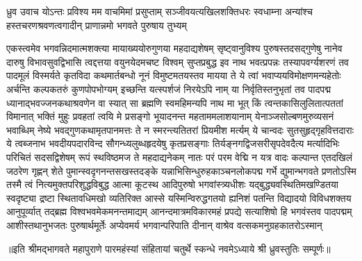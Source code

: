 
ध्रुव उवाच\nopagebreak[4]
\fourlineindentedshloka
{योऽन्तः प्रविश्य मम वाचमिमां प्रसुप्ताम्}
{सञ्जीवयत्यखिलशक्तिधरः स्वधाम्ना}
{अन्यांश्च हस्तचरणश्रवणत्वगादीन्}
{प्राणान्नमो भगवते पुरुषाय तुभ्यम्}

\fourlineindentedshloka
{एकस्त्वमेव भगवन्निदमात्मशक्त्या}
{मायाख्ययोरुगुणया महदाद्यशेषम्}
{सृष्ट्वानुविश्य पुरुषस्तदसद्गुणेषु}
{नानेव दारुषु विभावसुवद्विभासि}
\fourlineindentedshloka
{त्वद्दत्तया वयुनयेदमचष्ट विश्वम्}
{सुप्तप्रबुद्ध इव नाथ भवत्प्रपन्नः}
{तस्यापवर्ग्यशरणं तव पादमूलं}
{विस्मर्यते कृतविदा कथमार्तबन्धो}
\fourlineindentedshloka
{नूनं विमुष्टमतयस्तव मायया ते}
{ये त्वां भवाप्ययविमोक्षणमन्यहेतोः}
{अर्चन्ति कल्पकतरुं कुणपोपभोग्यम्}
{इच्छन्ति यत्स्पर्शजं निरयेऽपि नाम्}
\fourlineindentedshloka
{या निर्वृतिस्तनुभृतां तव पादपद्म}
{ध्यानाद्भवज्जनकथाश्रवणेन वा स्यात्}
{सा ब्रह्मणि स्वमहिमन्यपि नाथ मा भूत्}
{किं त्वन्तकासिलुलितात्पततां विमानात्}
\fourlineindentedshloka
{भक्तिं मुहुः प्रवहतां त्वयि मे प्रसङ्गो}
{भूयादनन्त महताममलाशयानाम्}
{येनाञ्जसोल्बणमुरुव्यसनं भवाब्धिम्}
{नेष्ये भवद्गुणकथामृतपानमत्तः}
\fourlineindentedshloka
{ते न स्मरन्त्यतितरां प्रियमीश मर्त्यम्}
{ये चान्वदः सुतसुहृद्गृहवित्तदाराः}
{ये त्वब्जनाभ भवदीयपदारविन्द}
{सौगन्ध्यलुब्धहृदयेषु कृतप्रसङ्गाः}
\fourlineindentedshloka
{तिर्यङ्नगद्विजसरीसृपदेवदैत्य}
{मर्त्यादिभिः परिचितं सदसद्विशेषम्}
{रूपं स्थविष्ठमज ते महदाद्यनेकम्}
{नातः परं परम वेद्मि न यत्र वादः}
\fourlineindentedshloka
{कल्पान्त एतदखिलं जठरेण गृह्णन्}
{शेते पुमान्स्वदृगनन्तसखस्तदङ्के}
{यन्नाभिसिन्धुरुहकाञ्चनलोकपद्म}
{गर्भे द्युमान्भगवते प्रणतोऽस्मि तस्मै}
\fourlineindentedshloka
{त्वं नित्यमुक्तपरिशुद्धविबुद्ध आत्मा}
{कूटस्थ आदिपुरुषो भगवांस्त्र्यधीशः}
{यद्बुद्ध्यवस्थितिमखण्डितया स्वदृष्ट्या}
{द्रष्टा स्थितावधिमखो व्यतिरिक्त आस्से}
\fourlineindentedshloka
{यस्मिन्विरुद्धगतयो ह्यनिशं पतन्ति}
{विद्यादयो विविधशक्तय आनुपूर्व्यात्}
{तद्ब्रह्म विश्वभवमेकमनन्तमाद्यम्}
{आनन्दमात्रमविकारमहं प्रपद्ये}
\fourlineindentedshloka
{सत्याशिषो हि भगवंस्तव पादपद्मम्}
{आशीस्तथानुभजतः पुरुषार्थमूर्तेः}
{अप्येवमर्य भगवान्परिपाति दीनान्}
{वाश्रेव वत्सकमनुग्रहकातरोऽस्मान्}

{॥इति श्रीमद्भागवते महापुराणे पारमहंस्यां संहितायां चतुर्थे स्कन्धे नवमेऽध्याये श्री ध्रुवस्तुतिः सम्पूर्णः॥}

